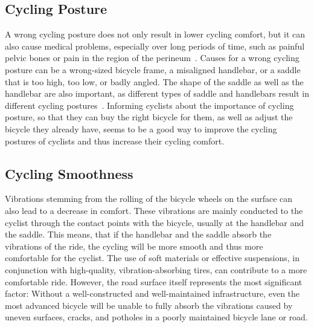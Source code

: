 \subsection*{Cycling Posture}
A wrong cycling posture does not only result in lower cycling comfort, but it can also cause medical problems, especially over long periods of time, such as painful pelvic bones or pain in the region of the
perineum~\cite{christiaans1998comfort}.
Causes for a wrong cycling posture can be a wrong-sized bicycle frame, a misaligned handlebar, or a saddle that is too high, too low, or badly angled.
The shape of the saddle as well as the handlebar are also important, as different types of saddle and handlebars result in different cycling postures~\cite{bressel2003bicycle}.
Informing cyclists about the importance of cycling posture, so that they can buy the right bicycle for them, as well as adjust the bicycle they already have, seems to be a good way to improve the cycling postures of cyclists and thus increase their cycling comfort.

\subsection*{Cycling Smoothness}
Vibrations stemming from the rolling of the bicycle wheels on the surface can also lead to a decrease in comfort.
These vibrations are mainly conducted to the cyclist through the contact points with the bicycle, usually at the handlebar and the saddle.
This means, that if the handlebar and the saddle absorb the vibrations of the ride, the cycling will be more smooth and thus more comfortable for the cyclist.
The use of soft materials or effective suspensions, in conjunction with high-quality, vibration-absorbing tires, can contribute to a more comfortable ride.
However, the road surface itself represents the most significant factor:
Without a well-constructed and well-maintained infrastructure, even the most advanced bicycle will be unable to fully absorb the vibrations caused by uneven surfaces, cracks, and potholes in a poorly maintained bicycle lane or road.

